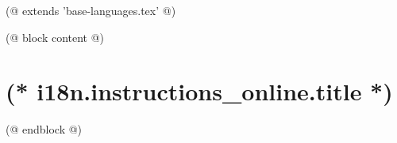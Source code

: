 (@ extends 'base-languages.tex' @)

(@ block content @)
    \pagestyle{instructions-online}
    \section{(* i18n.instructions_online.title *)}
    
(@ endblock @)
